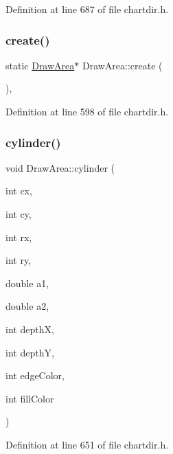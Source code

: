 Definition at line 687 of file chartdir.\+h.

\mbox{\label{class_draw_area_a0376490f6c7f56aef69d54b0ec9ef31e}} 
\subsubsection{\texorpdfstring{create()}{create()}}
{\footnotesize\ttfamily static \hyperlink{class_draw_area}{Draw\+Area}$\ast$ Draw\+Area\+::create (\begin{DoxyParamCaption}{ }\end{DoxyParamCaption})\hspace{0.3cm}{\ttfamily [inline]}, {\ttfamily [static]}}



Definition at line 598 of file chartdir.\+h.

\mbox{\label{class_draw_area_a0d8b5c5958f9b5bb43b19eea323a1bdb}} 
\subsubsection{\texorpdfstring{cylinder()}{cylinder()}}
{\footnotesize\ttfamily void Draw\+Area\+::cylinder (\begin{DoxyParamCaption}\item[{int}]{cx,  }\item[{int}]{cy,  }\item[{int}]{rx,  }\item[{int}]{ry,  }\item[{double}]{a1,  }\item[{double}]{a2,  }\item[{int}]{depthX,  }\item[{int}]{depthY,  }\item[{int}]{edge\+Color,  }\item[{int}]{fill\+Color }\end{DoxyParamCaption})\hspace{0.3cm}{\ttfamily [inline]}}



Definition at line 651 of file chartdir.\+h.

